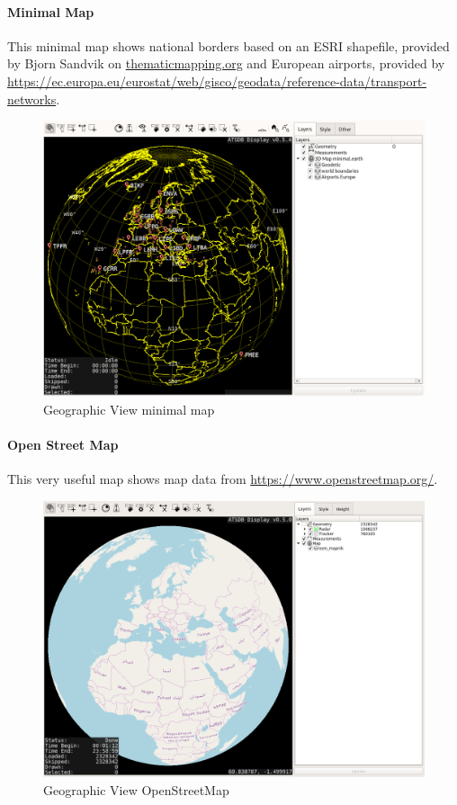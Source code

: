 \newpage
\paragraph{Minimal Map}

This minimal map shows national borders based on an ESRI shapefile, provided by Bjorn Sandvik on \url{thematicmapping.org} and European airports, provided by \url{https://ec.europa.eu/eurostat/web/gisco/geodata/reference-data/transport-networks}.

\begin{figure}[H]
    \hspace*{-2.5cm}
    \includegraphics[width=19cm,frame]{figures/geoview_minimal.png}
  \caption{Geographic View minimal map}
\end{figure}

\newpage
\paragraph{Open Street Map}

This very useful map shows map data from \url{https://www.openstreetmap.org/}.

\begin{figure}[H]
    \hspace*{-2.5cm}
    \includegraphics[width=19cm,frame]{figures/geoview_osm.png}
  \caption{Geographic View OpenStreetMap}
\end{figure}

